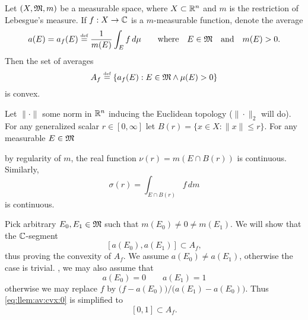 \begin{llem} \label{llem:averages:convex}
Let   \((X,\mathfrak{M},m)\)
be a measurable space, where \(X\subset \mathbb{R}^n\) and $m$
is the restriction of Lebesgue's measure.
If \(f:X\to\mathbb{C}\) is a $m$-measurable function,
denote the average
\begin{equation*}
a(E) = a_f(E) \stackrel{\mbox{\upshape\tiny def}}{=} \frac{1}{m(E)} \int_E f\,d\mu
 \qquad \textnormal{where}\quad E\in\mathfrak{M} \quad\textnormal{and}\quad m(E)>0.
\end{equation*}
Then the set of averages
\begin{equation*}
 A_f \stackrel{\mbox{\upshape\tiny def}}{=} \left\{a_f(E): E\in\mathfrak{M} \wedge \mu(E)>0 \right\}
\end{equation*}
is convex.
\end{llem}
\begin{thmproof}
Let \(\|\cdot\|\) some norm in \(\mathbb{R}^n\) inducing the Euclidean topology
(\(\|\cdot\|_2\) will do). For any generalized scalar \(r\in[0,\infty]\)
let \(B(r) = \{x\in X: \|x\|\leq r\}\).
For any measurable \(E\in\mathfrak{M}\)
\iffalse
and any scalar \(\alpha\in[0,+\infty]\), let
\begin{equation*}
 E_\alpha \eqdef \{x\in E: \|x\|\leq \alpha\}.
\end{equation*}
\fi
by regularity of $m$, the real function
\(\nu(r) = m(E\cap B(r))\) is continuous. Similarly,
\begin{equation*}
\sigma(r) = \int_{E\cap B(r)} f\,dm
\end{equation*}
is continuous.

Pick arbitrary \(E_0,E_1\in\mathfrak{M}\) such that \(m(E_0)\neq 0 \neq m(E_1)\).
We will show that the \(\mathbb{C}\)-segment
\begin{equation} \label{eq:llem:av:cvx:0}
[a(E_0),a(E_1)] \subset A_f,
\end{equation}
thus proving the convexity of \(A_f\).
We assume \(a(E_0) \neq a(E_1)\), otherwise the case is trivial.
\Wlogy, we may also assume that
\begin{equation} \label{eq:llem:av:cvx:1}
 a(E_0) = 0 \qquad a(E_1) = 1
\end{equation}
otherwise we may replace $f$ by
\(\bigl(f - a(E_0)\bigr)/\bigl(a(E_1) - a(E_0)\bigr)\).
Thus \eqref{eq:llem:av:cvx:0} is simplified to
\begin{equation} \label{eq:llem:av:cvx:2}
[0,1] \subset A_f.
\end{equation}
\iffalse
\(a(E_1)-a(E_0) = |a(E_1)-a(E_0)|e^{i\theta}\)
for some \(\theta\in[0,2\pi)\)
and we may substitue $f$ with \(e^{-i\theta}f\) and possibly
exchange \(E_0\) with \(E_1\).
\fi


\end{thmproof}
